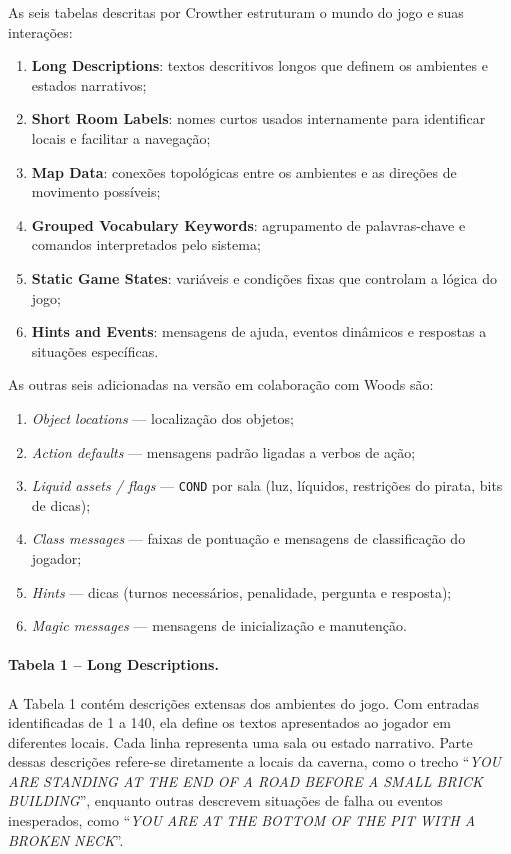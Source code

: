 \documentclass[12pt,a4paper]{article}
\begin{document}
As seis tabelas descritas por Crowther estruturam o mundo do jogo e suas interações:
\begin{enumerate}
    \item \textbf{Long Descriptions}: textos descritivos longos que definem os ambientes e estados narrativos;
    \item \textbf{Short Room Labels}: nomes curtos usados internamente para identificar locais e facilitar a navegação;
    \item \textbf{Map Data}: conexões topológicas entre os ambientes e as direções de movimento possíveis;
    \item \textbf{Grouped Vocabulary Keywords}: agrupamento de palavras-chave e comandos interpretados pelo sistema;
    \item \textbf{Static Game States}: variáveis e condições fixas que controlam a lógica do jogo;
    \item \textbf{Hints and Events}: mensagens de ajuda, eventos dinâmicos e respostas a situações específicas.
\end{enumerate}

As outras seis adicionadas na versão em colaboração com Woods são:

\begin{enumerate}
  \item \emph{Object locations} — localização dos objetos;
  \item \emph{Action defaults} — mensagens padrão ligadas a verbos de ação;
  \item \emph{Liquid assets / flags} — \texttt{COND} por sala (luz, líquidos, restrições do pirata, bits de dicas);
  \item \emph{Class messages} — faixas de pontuação e mensagens de classificação do jogador;
  \item \emph{Hints} — dicas (turnos necessários, penalidade, pergunta e resposta);
  \item \emph{Magic messages} — mensagens de inicialização e manutenção.
\end{enumerate}

\paragraph{Tabela 1 – Long Descriptions.}  
A Tabela 1 contém descrições extensas dos ambientes do jogo. Com entradas identificadas de 1 a 140, ela define os textos apresentados ao jogador em diferentes locais. Cada linha representa uma sala ou estado narrativo. Parte dessas descrições refere-se diretamente a locais da caverna, como o trecho “\textit{YOU ARE STANDING AT THE END OF A ROAD BEFORE A SMALL BRICK BUILDING}”, enquanto outras descrevem situações de falha ou eventos inesperados, como “\textit{YOU ARE AT THE BOTTOM OF THE PIT WITH A BROKEN NECK}”.  
\end{document}
